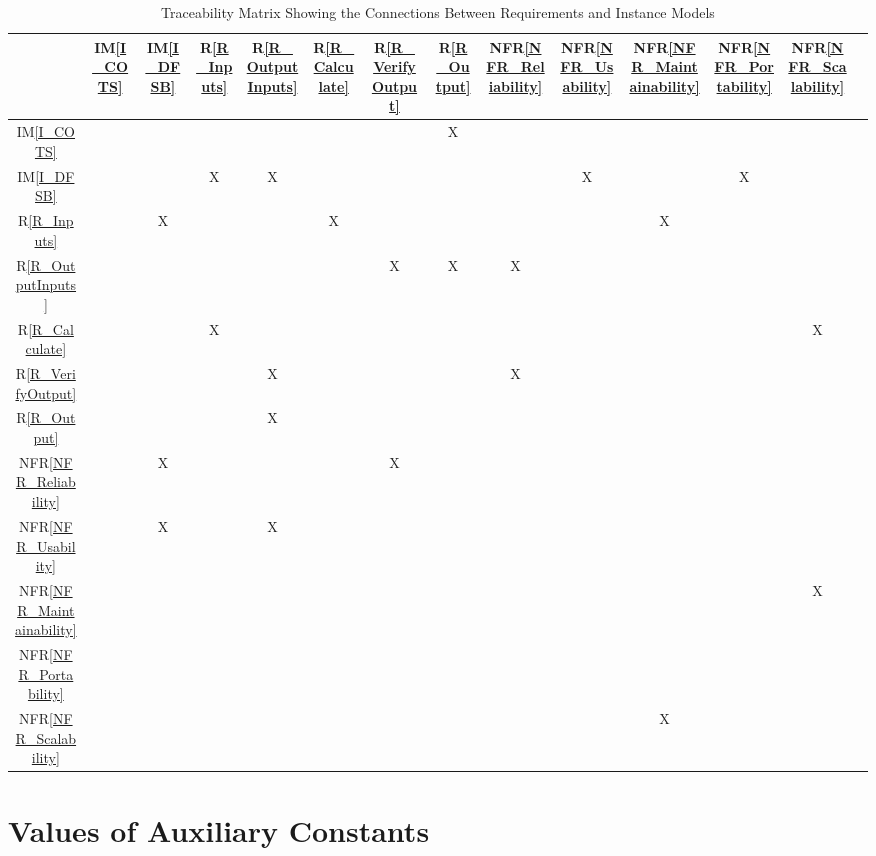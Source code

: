 \documentclass[12pt]{article}
\newcommand{\iref}[1]{IM\ref{#1}}
\newcommand{\rref}[1]{R\ref{#1}}
\newcommand{\nfrref}[1]{NFR\ref{#1}}
\begin{document}
\newpage
\begin{table}[H]
\centering
\begin{tabular}{|c|c|c|c|c|c|c|c|c|c|c|c|c|c|}
\hline
	& \iref{I_COTS} & \iref{I_DFSB} & \rref{R_Inputs} & \rref{R_OutputInputs} & \rref{R_Calculate} & \rref{R_VerifyOutput} & \rref{R_Output} & \nfrref{NFR_Reliability} & \nfrref{NFR_Usability} & \nfrref{NFR_Maintainability} & \nfrref{NFR_Portability} & \nfrref{NFR_Scalability} \\

\hline
\iref{I_COTS}         & & & & & & & X & & & & & \\ \hline
\iref{I_DFSB}         & & & X & X & & & & & X & & X &\\  \hline
\rref{R_Inputs}     & & X & & & X & & & & & X & & \\ \hline
\rref{R_OutputInputs} & & & & & & X & X & X & & & & \\ \hline
\rref{R_Calculate}     & & & X & & & & & & & & & X \\ \hline
\rref{R_VerifyOutput}  & & & & X & & & & X & & & & \\ \hline
\rref{R_Output} & & & & X & & & & & & & & \\ \hline
\nfrref{NFR_Reliability}   & & X & & & & X & & & & & & \\ \hline
\nfrref{NFR_Usability}   & & X & & X & & & & & & & & \\ \hline
\nfrref{NFR_Maintainability}   & & & & & & & & & & & & X \\ \hline
\nfrref{NFR_Portability}   & & & & & & & & & & & & \\ \hline
\nfrref{NFR_Scalability}   & & & & & & & & & & X & & \\
\hline
\end{tabular}
\caption{Traceability Matrix Showing the Connections Between Requirements and Instance Models}
\label{Table:R_trace}
\end{table}


\newpage
\section{Values of Auxiliary Constants}



\end{document}
